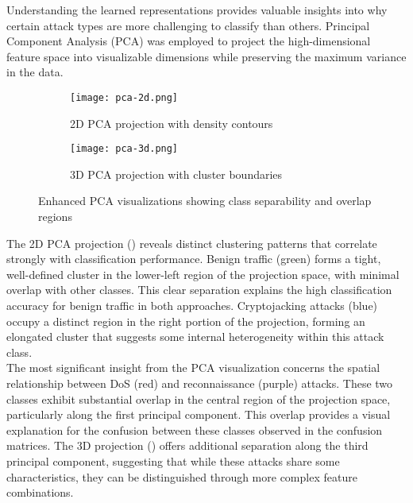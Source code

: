 Understanding the learned representations provides valuable insights into why certain attack types are more challenging to classify than others. Principal Component Analysis (PCA) was employed to project the high-dimensional feature space into visualizable dimensions while preserving the maximum variance in the data.

\begin{figure}[H]
	\centering
	\begin{subfigure}[b]{0.45\textwidth}
		\centering
		\texttt{[image: pca-2d.png]}
		\caption{2D PCA projection with density contours}
		\label{figure:pca-2d}
	\end{subfigure}
	\hspace{0cm} 
	\begin{subfigure}[b]{0.45\textwidth}
		\centering
		\texttt{[image: pca-3d.png]}
		\caption{3D PCA projection with cluster boundaries}
		\label{figure:pca-3d}
	\end{subfigure}
	\caption{Enhanced PCA visualizations showing class separability and overlap regions}
	\label{figure:pca-visualization}
\end{figure}

The 2D PCA projection () reveals distinct clustering patterns that correlate strongly with classification performance. Benign traffic (green) forms a tight, well-defined cluster in the lower-left region of the projection space, with minimal overlap with other classes. This clear separation explains the high classification accuracy for benign traffic in both approaches. Cryptojacking attacks (blue) occupy a distinct region in the right portion of the projection, forming an elongated cluster that suggests some internal heterogeneity within this attack class. \\

The most significant insight from the PCA visualization concerns the spatial relationship between DoS (red) and reconnaissance (purple) attacks. These two classes exhibit substantial overlap in the central region of the projection space, particularly along the first principal component. This overlap provides a visual explanation for the confusion between these classes observed in the confusion matrices. The 3D projection () offers additional separation along the third principal component, suggesting that while these attacks share some characteristics, they can be distinguished through more complex feature combinations. \\

